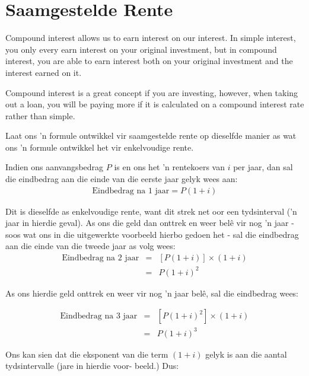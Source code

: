 \section{Saamgestelde Rente}

Compound interest allows us to earn interest on our interest. In simple interest, you only every earn interest on your original investment, but in compound interest, you are able to earn interest both on your original investment and the interest earned on it.\par

Compound interest is a great concept if you are investing, however, when taking out a loan, you will be paying more if it is calculated on a compound interest rate rather than simple.




Laat ons ’n formule ontwikkel vir saamgestelde rente op dieselfde manier as wat ons ’n formule ontwikkel het vir
enkelvoudige rente.\par

Indien ons aanvangsbedrag $P$ is en ons het ’n rentekoers van $i$ per jaar, dan sal die eindbedrag aan die einde
van die eerste jaar gelyk wees aan:
\begin{eqnarray*}
    \text{Eindbedrag na 1 jaar} = P(1 + i)
\end{eqnarray*}

Dit is dieselfde as enkelvoudige rente, want dit strek net oor een tydsinterval (’n jaar in hierdie geval). As ons die
geld dan onttrek en weer belê vir nog ’n jaar - soos wat ons in die uitgewerkte voorbeeld hierbo gedoen het - sal
die eindbedrag aan die einde van die tweede jaar as volg wees:
\begin{eqnarray*}
    \text{Eindbedrag na 2 jaar} &=& [P(1 + i)] \times (1 + i)\\
    &=& P(1 + i)^2
\end{eqnarray*}

As ons hierdie geld onttrek en weer vir nog ’n jaar belê, sal die eindbedrag wees:

\begin{eqnarray*}
    \text{Eindbedrag na 3 jaar} &=& [P(1 + i)^2] \times (1 + i)\\
    &=& P(1 + i)^3
\end{eqnarray*}

Ons kan sien dat die eksponent van die term $(1 + i)$ gelyk is aan die aantal tydsintervalle (jare in hierdie voor-
beeld.) Dus:


